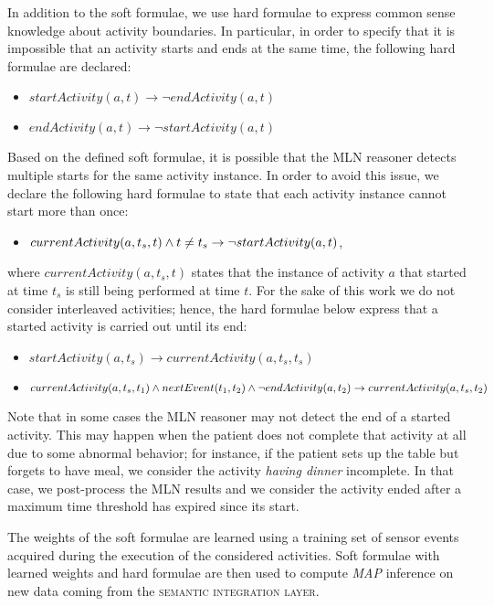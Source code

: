 \documentclass[10pt, conference, compsocconf]{IEEEtran}
\begin{document}
In addition to the soft formulae, we use hard formulae to express common sense knowledge about activity boundaries. In particular, in order to specify that it is impossible that an activity starts and ends at the same time, the following hard formulae are declared: 
\begin{itemize}
\item $startActivity(a,t) \rightarrow \neg endActivity(a,t)$
\item $endActivity(a,t)  \rightarrow \neg startActivity(a,t)$
\end{itemize}


Based on the defined soft formulae, it is possible that the MLN reasoner detects multiple starts for the same activity instance. In order to avoid this issue, we declare the following hard formulae to state that each activity instance cannot start more than once:
\begin{itemize}
\item $currentActivity(a,t_{s}, t) \wedge t \neq t_{s} \\ \rightarrow \neg startActivity(a,t)$,
\end{itemize}
where $currentActivity(a, t_{s}, t)$ states that the instance of activity $a$ that started at 
time $t_s$ is still being performed at time $t$. 
For the sake of this work we do not consider interleaved activities; hence, the hard formulae 
below express that a started activity is carried out until its end:
\begin{itemize}
\item $startActivity(a,t_s) \rightarrow currentActivity(a,t_{s}, t_s)$
\item $currentActivity(a, t_s, t_1) \wedge nextEvent(t_1, t_2) \wedge \\ \neg endActivity(a, t_2)
\rightarrow currentActivity(a, t_s, t_2)$ 
\end{itemize}


Note that in some cases the MLN reasoner may not detect the end of a started activity. This may happen when the patient does not complete that activity at all due to some abnormal behavior; for instance, if the patient sets up the table but forgets to have meal, we consider the activity \emph{having dinner} incomplete. In that case, we post-process the MLN results and we consider the activity ended after a maximum time threshold has expired since its start.

The weights of the soft formulae are learned using a training set of sensor events acquired during the execution of the considered activities. Soft formulae with learned weights and hard formulae are then used to compute \emph{MAP} inference on new data coming from the \textsc{semantic integration layer}. 
\end{document}
